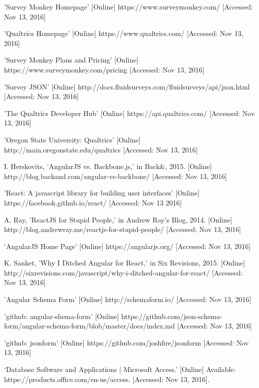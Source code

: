 \documentclass[letterpaper,10pt,serif, draftclsnofoot,onecolumn, compsoc, titlepage]{IEEEtran}
\begin{document}
\begin{thebibliography}{2}
'Survey Monkey Homepage' [Online] https://www.surveymonkey.com/ [Accessed: Nov 13, 2016]

'Qualtrics Homepage' [Online] https://www.qualtrics.com/ [Accessed: Nov 13, 2016]

'Survey Monkey Plans and Pricing' [Online] https://www.surveymonkey.com/pricing [Accessed: Nov 13, 2016]

'Survey JSON' [Online] http://docs.fluidsurveys.com/fluidsurveys/api/json.html [Accessed: Nov 13, 2016]

'The Qualtrics Developer Hub' [Online] https://api.qualtrics.com/ [Accessed: Nov 13, 2016]

'Oregon State University: Qualtrics' [Online] http://main.oregonstate.edu/qualtrics [Accessed: Nov 13, 2016]

I. Herskovits, 'AngularJS vs. Backbone.js,' in Back\&, 2015. [Online] http://blog.backand.com/angular-vs-backbone/ [Accessed: Nov 13, 2016]

'React: A javascript library for building user interfaces' [Online] https://facebook.github.io/react/ [Accessed: Nov 13 2016]

A. Ray, 'ReactJS for Stupid People,' in Andrew Ray’s Blog, 2014. [Online] http://blog.andrewray.me/reactjs-for-stupid-people/ [Accessed: Nov 13, 2016]

'AngularJS Home Page' [Online] https://angularjs.org/ [Accessed: Nov 13, 2016]

K. Sanket, 'Why I Ditched Angular for React,' in Six Revisions, 2015. [Online] http://sixrevisions.com/javascript/why-i-ditched-angular-for-react/ [Accessed: Nov 13, 2016]

'Angular Schema Form' [Online] http://schemaform.io/ [Accessed: Nov 13, 2016]

'github: angular-shema-form' [Online] https://github.com/json-schema-form/angular-schema-form/blob/master/docs/index.md [Accessed: Nov 13, 2016]

'github: jsonform' [Online] https://github.com/joshfire/jsonform [Accessed: Nov 13, 2016]

`Database Software and Applications | Microsoft Access.' [Online] Available: https://products.office.com/en-us/access. [Accessed: Nov 13, 2016].


\end{thebibliography}
\end{document}
